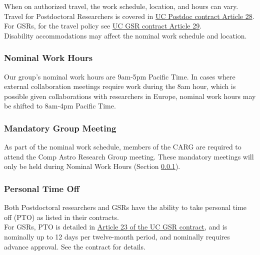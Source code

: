 \noindent
When on authorized travel, the work schedule, location, and hours can vary. Travel for Postdoctoral Researchers is covered in \href{https://ucnet.universityofcalifornia.edu/wp-content/uploads/labor/bargaining-units/px/docs/px_tentative_agremeents_effective_12-09-2022.pdf}{UC Postdoc contract Article 28}. For GSRs, for the travel policy see \href{https://qa.ucnet.universityofcalifornia.edu/labor/bargaining-units/br/docs/br_29_travel_2022-2025.pdf}{UC GSR contract Article 29}.\\

\noindent
Disability accommodations may affect the nominal work schedule and location.

\subsubsection{Nominal Work Hours}
\label{sec:nominal_work_hours}

Our group's nominal work hours are 9am-5pm Pacific Time. In cases where external collaboration meetings require work during the 8am hour, which is possible given collaborations with researchers in Europe, nominal work hours may be shifted to 8am-4pm Pacific Time.

\subsubsection{Mandatory Group Meeting}

As part of the nominal work schedule, members of the CARG are required to attend the Comp Astro Research Group meeting. These mandatory meetings will
only be held during Nominal Work Hours (Section \ref{sec:nominal_work_hours}).

\subsubsection{Personal Time Off}

Both Postdoctoral researchers and GSRs have the ability to take personal time off (PTO) as listed in their contracts.\\

\noindent
For GSRs, PTO is
detailed in \href{https://ucnet.universityofcalifornia.edu/wp-content/uploads/labor/bargaining-units/br/docs/br_23_personal-time-off_2022-2025.pdf}{Article 23 of the UC GSR contract}, and is nominally up to 12 days per twelve-month period, and nominally requires advance approval. See the contract for details.\\


